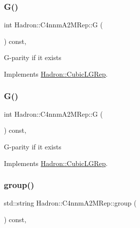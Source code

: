 \subsubsection{\texorpdfstring{G()}{G()}\hspace{0.1cm}{\footnotesize\ttfamily [2/3]}}
{\footnotesize\ttfamily int Hadron\+::\+C4nnm\+A2\+M\+Rep\+::G (\begin{DoxyParamCaption}{ }\end{DoxyParamCaption}) const\hspace{0.3cm}{\ttfamily [inline]}, {\ttfamily [virtual]}}

G-\/parity if it exists 

Implements \mbox{\hyperlink{structHadron_1_1CubicLGRep_ace26f7b2d55e3a668a14cb9026da5231}{Hadron\+::\+Cubic\+L\+G\+Rep}}.

\mbox{\label{structHadron_1_1C4nnmA2MRep_a4a41dd35707514a4f23fe162a37918b4}} 
\subsubsection{\texorpdfstring{G()}{G()}\hspace{0.1cm}{\footnotesize\ttfamily [3/3]}}
{\footnotesize\ttfamily int Hadron\+::\+C4nnm\+A2\+M\+Rep\+::G (\begin{DoxyParamCaption}{ }\end{DoxyParamCaption}) const\hspace{0.3cm}{\ttfamily [inline]}, {\ttfamily [virtual]}}

G-\/parity if it exists 

Implements \mbox{\hyperlink{structHadron_1_1CubicLGRep_ace26f7b2d55e3a668a14cb9026da5231}{Hadron\+::\+Cubic\+L\+G\+Rep}}.

\mbox{\label{structHadron_1_1C4nnmA2MRep_a469cdf0a49cdd54d88ab2786a8b25f13}} 
\subsubsection{\texorpdfstring{group()}{group()}\hspace{0.1cm}{\footnotesize\ttfamily [1/3]}}
{\footnotesize\ttfamily std\+::string Hadron\+::\+C4nnm\+A2\+M\+Rep\+::group (\begin{DoxyParamCaption}{ }\end{DoxyParamCaption}) const\hspace{0.3cm}{\ttfamily [inline]}, {\ttfamily [virtual]}}

